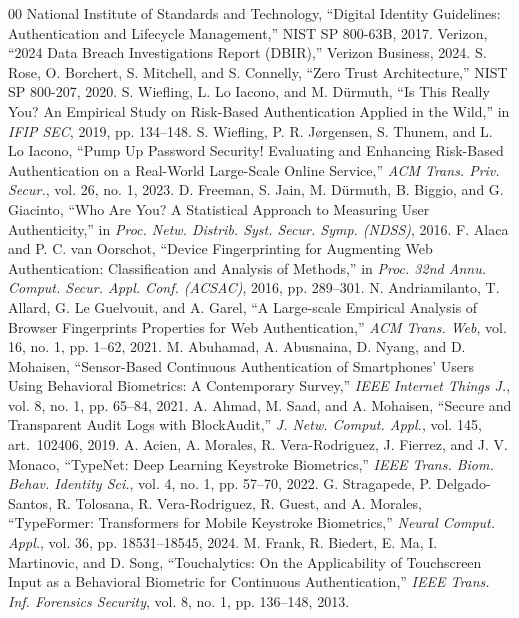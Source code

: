 \documentclass[conference]{IEEEtran}
\begin{document}
\balance
\begin{thebibliography}{00}
 National Institute of Standards and Technology, ``Digital Identity Guidelines: Authentication and Lifecycle Management,'' NIST SP 800-63B, 2017.
 Verizon, ``2024 Data Breach Investigations Report (DBIR),'' Verizon Business, 2024.
 S. Rose, O. Borchert, S. Mitchell, and S. Connelly, ``Zero Trust Architecture,'' NIST SP 800-207, 2020.
 S. Wiefling, L. Lo Iacono, and M. D\"urmuth, ``Is This Really You? An Empirical Study on Risk-Based Authentication Applied in the Wild,'' in \emph{IFIP SEC}, 2019, pp. 134--148.
 S. Wiefling, P. R. J\o rgensen, S. Thunem, and L. Lo Iacono, ``Pump Up Password Security! Evaluating and Enhancing Risk-Based Authentication on a Real-World Large-Scale Online Service,'' \emph{ACM Trans. Priv. Secur.}, vol. 26, no. 1, 2023.
 D. Freeman, S. Jain, M. D\"urmuth, B. Biggio, and G. Giacinto, ``Who Are You? A Statistical Approach to Measuring User Authenticity,'' in \emph{Proc. Netw. Distrib. Syst. Secur. Symp. (NDSS)}, 2016.
 F. Alaca and P. C. van Oorschot, ``Device Fingerprinting for Augmenting Web Authentication: Classification and Analysis of Methods,'' in \emph{Proc. 32nd Annu. Comput. Secur. Appl. Conf. (ACSAC)}, 2016, pp. 289--301.
 N. Andriamilanto, T. Allard, G. Le Guelvouit, and A. Garel, ``A Large-scale Empirical Analysis of Browser Fingerprints Properties for Web Authentication,'' \emph{ACM Trans. Web}, vol. 16, no. 1, pp. 1--62, 2021.
 M. Abuhamad, A. Abusnaina, D. Nyang, and D. Mohaisen, ``Sensor-Based Continuous Authentication of Smartphones' Users Using Behavioral Biometrics: A Contemporary Survey,'' \emph{IEEE Internet Things J.}, vol. 8, no. 1, pp. 65--84, 2021.
 A. Ahmad, M. Saad, and A. Mohaisen, ``Secure and Transparent Audit Logs with BlockAudit,'' \emph{J. Netw. Comput. Appl.}, vol. 145, art.\ 102406, 2019.
 A. Acien, A. Morales, R. Vera-Rodriguez, J. Fierrez, and J. V. Monaco, ``TypeNet: Deep Learning Keystroke Biometrics,'' \emph{IEEE Trans. Biom. Behav. Identity Sci.}, vol. 4, no. 1, pp. 57--70, 2022.
 G. Stragapede, P. Delgado-Santos, R. Tolosana, R. Vera-Rodriguez, R. Guest, and A. Morales, ``TypeFormer: Transformers for Mobile Keystroke Biometrics,'' \emph{Neural Comput. Appl.}, vol. 36, pp. 18531--18545, 2024.
 M. Frank, R. Biedert, E. Ma, I. Martinovic, and D. Song, ``Touchalytics: On the Applicability of Touchscreen Input as a Behavioral Biometric for Continuous Authentication,'' \emph{IEEE Trans. Inf. Forensics Security}, vol. 8, no. 1, pp. 136--148, 2013.

\end{thebibliography}
\end{document}
